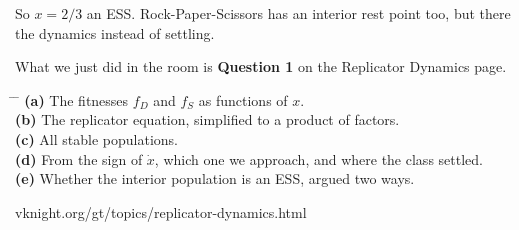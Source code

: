\vspace{1.2cm}

\begin{center}
\end{center}

\vspace{1cm}

{\large So \(x = 2/3\)  an ESS. Rock-Paper-Scissors
has an interior rest point too, but there the dynamics
 instead of settling.}

\newpage
{}

\vspace{0.5cm}

{\large What we just did in the room is \textbf{Question 1} on the Replicator
Dynamics page.}

\vspace{0.9cm}

\hspace{0.6cm}
\begin{minipage}{0.92\linewidth}
{\large
\begin{tabbing}
\hspace{1.2cm} \= \hspace{17cm} \= \kill
\textbf{(a)} \> The fitnesses \(f_D\) and \(f_S\) as functions of
  \(x\). \> [3]\\[0.55em]
\textbf{(b)} \> The replicator equation, simplified to a product of
  factors. \> [7]\\[0.55em]
\textbf{(c)} \> All stable populations. \> [3]\\[0.55em]
\textbf{(d)} \> From the sign of \(\dot{x}\), which one we approach, and where
  the class settled. \> [6]\\[0.55em]
\textbf{(e)} \> Whether the interior population is an ESS, argued two
  ways. \> [6]
\end{tabbing}}
\end{minipage}

\vspace{1.2cm}

\begin{center}
{\large\color{inkgrey} vknight.org/gt/topics/replicator-dynamics.html}
\end{center}

